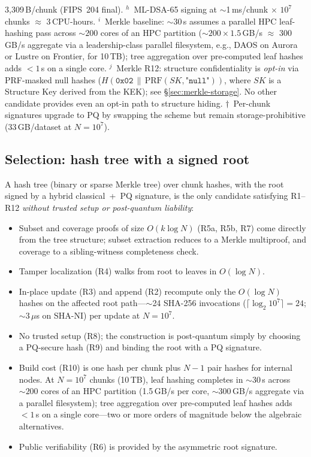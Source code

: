\documentclass[11pt]{article}
\begin{document}
\begin{table}[H]
{3{,}309\,B/chunk (FIPS~204 final).
$^h$~ML-DSA-65 signing at $\sim$1\,ms/chunk $\times$ $10^7$ chunks
$\approx$ 3\,CPU-hours.
$^i$~Merkle baseline: $\sim$30\,s assumes a parallel HPC leaf-hashing pass
across ${\sim}200$ cores of an HPC partition (${\sim}200 \times 1.5$\,GB/s $\approx$ 300\,GB/s
aggregate via a leadership-class parallel filesystem, e.g., DAOS on Aurora or
Lustre on Frontier, for 10\,TB);
tree aggregation over pre-computed leaf hashes adds $<1$\,s on a single core.
$^j$~Merkle R12: structure confidentiality is \emph{opt-in} via
PRF-masked null hashes ($H(\texttt{0x02}\,\|\,\text{PRF}(SK,\texttt{"null"}))$,
where $SK$ is a Structure Key derived from the KEK); see \S\ref{sec:merkle-storage}.
No other candidate provides even an opt-in path to structure hiding.
$\dagger$~Per-chunk signatures upgrade to PQ by swapping the scheme but
remain storage-prohibitive (33\,GB/dataset at $N=10^7$).}
\label{tab:integrity-comparison}
\end{table}

\subsection{Selection: hash tree with a signed root}
\label{sec:selection-conclusion}

A hash tree (binary or sparse Merkle tree) over chunk hashes, with the root
signed by a hybrid classical~+~PQ signature, is the only candidate satisfying
R1--R12 \emph{without trusted setup or post-quantum liability}:

\begin{itemize}[nosep]
  \item Subset and coverage proofs of size $O(k\log N)$ (R5a, R5b, R7) come
    directly from the tree structure; subset extraction reduces to a Merkle
    multiproof, and coverage to a sibling-witness completeness check.
  \item Tamper localization (R4) walks from root to leaves in $O(\log N)$.
  \item In-place update (R3) and append (R2) recompute only the
    $O(\log N)$ hashes on the affected root path---$\sim$24 SHA-256
    invocations ($\lceil\log_2 10^7\rceil = 24$; $\sim$3\,$\mu$s on SHA-NI)
    per update at $N=10^7$.
  \item No trusted setup (R8); the construction is post-quantum simply by
    choosing a PQ-secure hash (R9) and binding the root with a PQ signature.
  \item Build cost (R10) is one hash per chunk plus $N-1$ pair hashes for
    internal nodes. At $N=10^7$ chunks (10\,TB), leaf hashing completes in
    $\sim$30\,s across ${\sim}200$ cores of an HPC partition (1.5\,GB/s per
    core, $\sim$300\,GB/s aggregate via a parallel filesystem); tree
    aggregation over pre-computed leaf hashes adds $<1$\,s on a single
    core---two or more orders of magnitude below the algebraic alternatives.
  \item Public verifiability (R6) is provided by the asymmetric root
    signature.
\end{itemize}
\end{document}

